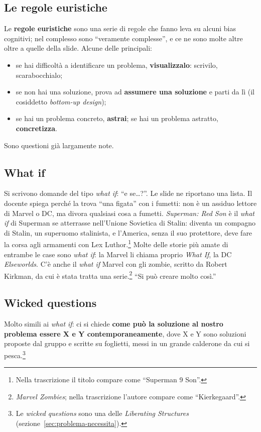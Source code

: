 \subsection{Le regole euristiche}

Le \textbf{regole euristiche} sono una serie di regole che fanno leva su
alcuni bias cognitivi; nel complesso sono ``veramente complesse'', e ce ne
sono molte altre oltre a quelle della slide. Alcune delle principali:
\begin{itemize}
  \item se hai difficoltà a identificare un problema, \textbf{visualizzalo}:
        scrivilo, scarabocchialo;
  \item se non hai una soluzione, prova ad \textbf{assumere una soluzione} e
        parti da lì (il cosiddetto \emph{bottom-up design});
  \item se hai un problema concreto, \textbf{astrai}; se hai un problema
        astratto, \textbf{concretizza}.
\end{itemize}
Sono questioni già largamente note.

\subsection{What if}

Si scrivono domande del tipo \emph{what if}: ``e se\dots?''. Le slide ne
riportano una lista. Il docente spiega perché la trova ``una figata'' con i
fumetti: non è un assiduo lettore di Marvel o DC, ma divora qualsiasi cosa a
fumetti. \emph{Superman: Red Son} è il \emph{what if} di Superman se
atterrasse nell'Unione Sovietica di Stalin: diventa un compagno di Stalin, un
superuomo stalinista, e l'America, senza il suo protettore, deve fare la
corsa agli armamenti con Lex Luthor.\footnote{Nella trascrizione il titolo
compare come ``Superman 9 Son''.} Molte delle storie più amate di entrambe le
case sono \emph{what if}: la Marvel li chiama proprio \emph{What If}, la DC
\emph{Elseworlds}. C'è anche il \emph{what if} Marvel con gli zombie, scritto
da Robert Kirkman, da cui è stata tratta una serie.\footnote{\emph{Marvel
Zombies}; nella trascrizione l'autore compare come ``Kierkegaard''.} ``Si può
creare molto così.''

\subsection{Wicked questions}

Molto simili ai \emph{what if}: ci si chiede \textbf{come può la soluzione al
nostro problema essere X e Y contemporaneamente}, dove X e Y sono soluzioni
proposte dal gruppo e scritte su foglietti, messi in un grande calderone da
cui si pesca.\footnote{Le \emph{wicked questions} sono una delle
\emph{Liberating Structures} (sezione~\ref{sec:problema-necessita}).}

